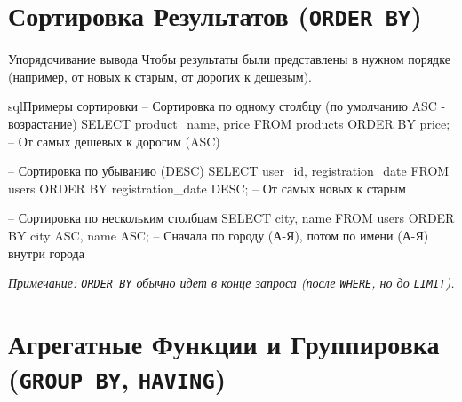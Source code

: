 \section{Сортировка Результатов (\texttt{ORDER BY})}

\begin{myblock}{Упорядочивание вывода}
    Чтобы результаты были представлены в нужном порядке (например, от новых к старым, от дорогих к дешевым).
    \begin{codebox}{sql}{Примеры сортировки}
    -- Сортировка по одному столбцу (по умолчанию ASC - возрастание)
    SELECT product_name, price
    FROM products
    ORDER BY price; -- От самых дешевых к дорогим (ASC)

    -- Сортировка по убыванию (DESC)
    SELECT user_id, registration_date
    FROM users
    ORDER BY registration_date DESC; -- От самых новых к старым

    -- Сортировка по нескольким столбцам
    SELECT city, name
    FROM users
    ORDER BY city ASC, name ASC; -- Сначала по городу (А-Я), потом по имени (А-Я) внутри города
    \end{codebox}
    \textit{Примечание: \texttt{ORDER BY} обычно идет в конце запроса (после \texttt{WHERE}, но до \texttt{LIMIT}).}
\end{myblock}

\section{Агрегатные Функции и Группировка (\texttt{GROUP BY}, \texttt{HAVING})}

